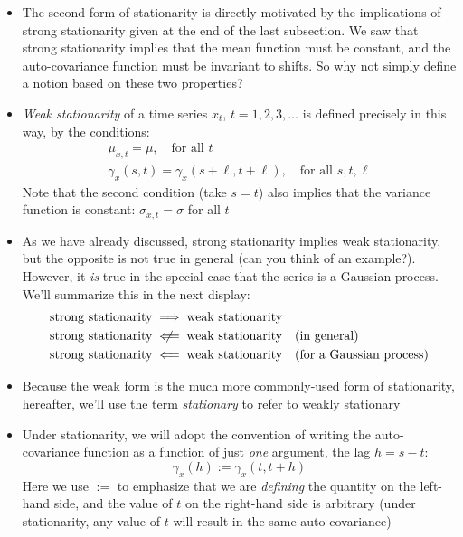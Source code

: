 \documentclass{article}
\begin{document}
\begin{itemize}
\item The second form of stationarity is directly motivated by the implications
  of strong stationarity given at the end of the last subsection. We saw that
  strong stationarity implies that the mean function must be constant, and the
  auto-covariance function must be invariant to shifts. So why not simply
  define a notion based on these two properties?

\item \emph{Weak stationarity} of a time series $x_t$, $t = 1,2,3,\dots$ is
  defined precisely in this way, by the conditions: 
 \begin{gather*}
  \mu_{x,t} = \mu, \quad \text{for all $t$} \\
  \gamma_x(s,t) = \gamma_x(s+\ell, t+\ell), \quad \text{for all $s,t,\ell$}   
  \end{gather*}
  Note that the second condition (take $s=t$) also implies that the variance
  function is constant: $\sigma_{x,t} = \sigma$ for all $t$

\item As we have already discussed, strong stationarity implies weak
  stationarity, but the opposite is not true in general (can you think of an 
  example?). However, it \emph{is} true in the special case that the series is a 
  Gaussian process. We'll summarize this in the next display:
  \begin{align*}
  \text{strong stationarity} &\implies \text{weak stationarity} \\
  \text{strong stationarity} &\centernot\impliedby \text{weak stationarity}   
  \quad \text{(in general)} \\
  \text{strong stationarity} &\impliedby \text{weak stationarity}  
  \quad \text{(for a Gaussian process)} 
  \end{align*}

\item Because the weak form is the much more commonly-used form of stationarity, 
  hereafter, we'll use the term \emph{stationary} to refer to weakly stationary

\item Under stationarity, we will adopt the convention of writing the
  auto-covariance function as a function of just \emph{one} argument, the lag
  $h = s-t$: 
  \[
  \gamma_x(h) := \gamma_x(t, t+h)
  \]
  Here we use $:=$ to emphasize that we are \emph{defining} the quantity on the
  left-hand side, and the value of $t$ on the right-hand side is arbitrary
  (under stationarity, any value of $t$ will result in the same auto-covariance) 


\end{itemize}
\end{document}
